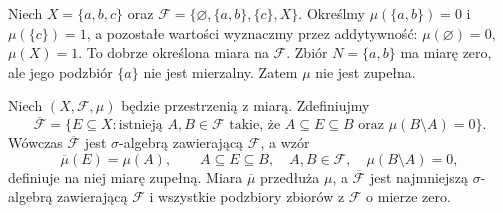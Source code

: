 \begin{przyklad}
\label{ex:incomplete-measure}
Niech $X=\{a,b,c\}$ oraz
$\mathcal F=\{\varnothing,\{a,b\},\{c\},X\}$.
Określmy $\mu(\{a,b\})=0$ i $\mu(\{c\})=1$,
a pozostałe wartości wyznaczmy przez addytywność:
$\mu(\varnothing)=0$, $\mu(X)=1$.
To dobrze określona miara na $\mathcal F$.
Zbiór $N=\{a,b\}$ ma miarę zero, ale jego podzbiór
$\{a\}$ nie jest mierzalny. Zatem $\mu$ nie jest zupełna.
\end{przyklad}

\begin{twierdzenie}
\label{thm:completion}
Niech $(X,\mathcal F,\mu)$ będzie przestrzenią z miarą.
Zdefiniujmy
\[
\overline{\mathcal F}
=\{E\subseteq X:\text{istnieją }A,B\in\mathcal F
\text{ takie, że }A\subseteq E\subseteq B
\text{ oraz }\mu(B\setminus A)=0\}.
\]
Wówczas $\overline{\mathcal F}$ jest $\sigma$-algebrą zawierającą
$\mathcal F$, a wzór
\[
\overline\mu(E)=\mu(A),\qquad
A\subseteq E\subseteq B,\quad A,B\in\mathcal F,
\quad\mu(B\setminus A)=0,
\]
definiuje na niej miarę zupełną. Miara $\overline\mu$
przedłuża $\mu$, a $\overline{\mathcal F}$ jest najmniejszą
$\sigma$-algebrą zawierającą $\mathcal F$ i wszystkie
podzbiory zbiorów z $\mathcal F$ o mierze zero.
\end{twierdzenie}
